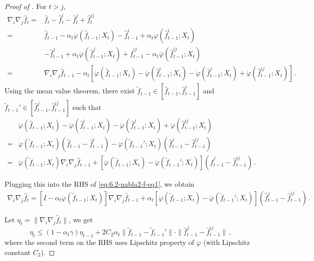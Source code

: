 \documentclass[10pt,a4paper]{amsart}
\begin{document}
\begin{proof}[Proof of ]
For $t>j$,
\begin{align}
  \nabla_i\nabla_j\hat f_{t}= & \hat f_{t} - \hat f^i_{t} - \hat f^j_{t}+\hat f^{ij}_{t}\nonumber\\
=&\hat f_{t-1}-\alpha_{t}\dot\varphi(\hat f_{t-1};X_t) -
\hat f^i_{t-1}+\alpha_{t}\dot\varphi(\hat f^i_{t-1};X_t) \nonumber\\
&-\hat f^j_{t-1}+\alpha_{t}\dot\varphi(\hat f^j_{t-1};X_t) +
\hat f^{ij}_{t-1}-\alpha_{t}\dot\varphi(\hat f^{ij}_{t-1};X_t) \nonumber\\
=&\nabla_i\nabla_j \hat f_{t-1} - \alpha_t\left[\dot\varphi(\hat f_{t-1};X_t)-\dot\varphi(\hat f_{t-1}^i;X_t)-\dot\varphi(\hat f_{t-1}^j;X_t)+\dot\varphi(\hat f_{t-1}^{ij};X_t)\right]\,.\label{eq:6.2-nabla2-f-eq1}
\end{align}
Using the mean value theorem, there exist $\tilde f_{t-1}\in[\hat f_{t-1},\hat f_{t-1}^i]$ and $\tilde f_{t-1}'\in[\hat f_{t-1}^j,\hat f_{t-1}^{ij}]$ such that
\begin{align*}
&  \dot\varphi(\hat f_{t-1};X_t)-\dot\varphi(\hat f_{t-1}^i;X_t)-\dot\varphi(\hat f_{t-1}^j;X_t)+\dot\varphi(\hat f_{t-1}^{ij};X_t)\\
=& \ddot\varphi(\tilde  f_{t-1};X_t)(\hat f_{t-1}-\hat f_{t-1}^i)-\ddot\varphi(\tilde f_{t-1}';X_t)(\hat f_{t-1}^j-\hat f_{t-1}^{ij})\\
=&\ddot\varphi(\tilde  f_{t-1};X_t) \nabla_i\nabla_j\hat f_{t-1}+\left[\ddot\varphi(\tilde f_{t-1};X_t)-\ddot\varphi(\tilde f_{t-1}';X_t)\right](\hat f_{t-1}^j-\hat f_{t-1}^{ij})\,.
\end{align*}

Plugging this into the RHS of \eqref{eq:6.2-nabla2-f-eq1}, we obtain
\begin{align*}
  \nabla_i\nabla_j\hat f_t = \left[I-\alpha_t \ddot\varphi(\tilde  f_{t-1};X_t)\right] \nabla_i\nabla_j\hat f_{t-1}+\alpha_t\left[\ddot\varphi(\tilde f_{t-1};X_t)-\ddot\varphi(\tilde f_{t-1}';X_t)\right](\hat f_{t-1}^j-\hat f_{t-1}^{ij})\,.
\end{align*}


Let $\eta_t=\|\nabla_i\nabla_j\hat f_t\|$, we get
\begin{equation}
\eta_t\le (1-\alpha_t\gamma)\eta_{t-1}+2C_2 \alpha_t\|\tilde  f_{t-1}-\tilde f_{t-1}'\|\cdot\|\hat f_{t-1}^j-\hat f_{t-1}^{ij}\|\,,\label{eq:6.2-eta-rec-1}
\end{equation}
where the second term on the RHS uses Lipschitz property of $\ddot\varphi$ (with Lipschitz constant $C_2$).


\end{proof}
\end{document}
